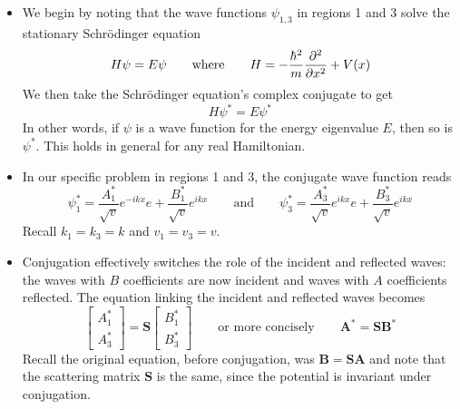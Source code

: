 \documentclass[11pt, a4paper]{article}
\newcommand{\eqtext}[1]{\qquad \text{#1} \qquad}
\newcommand{\Schro}{Schr\"{o}dinger\xspace}
\renewcommand{\vec}[1]{\bm{#1}} %
\newcommand{\mat}[1]{\mathbf{#1}} %
\begin{document}
\begin{itemize}
	\item  We begin by noting that the wave functions $ \psi_{1,3} $ in regions 1 and 3 solve the stationary \Schro equation
	\begin{equation*}
		H \psi = E \psi \eqtext{where} H = -\frac{\hbar^{2}}{m}\pdv[2]{}{x} + V(x)
	\end{equation*}
	We then take the \Schro equation's complex conjugate to get
	\begin{equation*}
		H \psi^{*} = E\psi^{*}
	\end{equation*}
	In other words, if $ \psi $ is a wave function for the energy eigenvalue $ E $, then so is $ \psi^{*} $. This holds in general for any real Hamiltonian. 
	
	\item In our specific problem in regions 1 and 3, the conjugate wave function reads
	\begin{equation*}
		\psi_{1}^{*} = \frac{A_{1}^{*}}{\sqrt{v}}e^{-ikx} e + \frac{B_{1}^{*}}{\sqrt{v}}e^{ikx} \eqtext{and} \psi_{3}^{*} = \frac{A_{3}^{*}}{\sqrt{v}}e^{ikx} e + \frac{B_{3}^{*}}{\sqrt{v}}e^{ikx}
	\end{equation*}
	Recall $ k_{1} = k_{3} = k $ and $ v_{1} = v_{3} = v $.
	
	\item Conjugation effectively switches the role of the incident and reflected waves: the waves with $ B $ coefficients are now incident and waves with $ A $ coefficients reflected. The equation linking the incident and reflected waves becomes
	\begin{equation*}
		\begin{bmatrix}
			A_{1}^{*}\\
			A_{3}^{*} 
		\end{bmatrix}
		= 
		\mat{S}
		\begin{bmatrix}
			B_{1}^{*}\\
			B_{3}^{*}
		\end{bmatrix}
		\eqtext{or more concisely} \vec{A}^{*} = \mat{S} \vec{B}^{*}
	\end{equation*}
	Recall the original equation, before conjugation, was $ \vec{B} = \mat{S} \vec{A} $ and note that the scattering matrix $ \mat{S} $ is the same, since the potential is invariant under conjugation.
	

\end{itemize}
\end{document}
